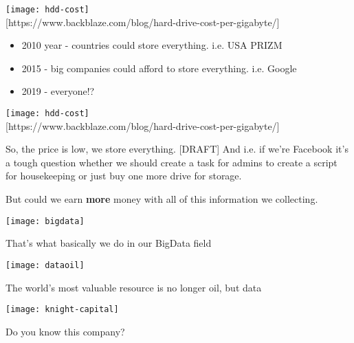\documentclass[aspectratio=169, 15pt,usenames,dvipsnames]{beamer}
\begin{document}
\begin{gdsw}
	\centering\texttt{[image: hdd-cost]}\\
	\centering\tiny [https://www.backblaze.com/blog/hard-drive-cost-per-gigabyte/]
	\par\normalsize\centering\begin{itemize}
	\item 2010 year - countries could store everything. i.e. USA PRIZM
	\item 2015 - big companies could afford to store everything. i.e. Google
	\item 2019 - everyone!?
	\end{itemize}
\end{gdsw}
\begin{gdsw}
	\centering\texttt{[image: hdd-cost]}\\
	\centering\tiny [https://www.backblaze.com/blog/hard-drive-cost-per-gigabyte/]
	\par\Large
	So, the price is low, we store everything. 
	[DRAFT]
	And i.e. if we're Facebook it's a tough question whether we should create a task for admins to create a script for housekeeping or just buy one more drive for storage.
\end{gdsw}
\begin{gdsw}
	\par\centering\Large
	But could we earn {\bf more} money with all of this information we collecting.\\        
\end{gdsw}
\begin{gdsw}
	\centering\texttt{[image: bigdata]}
	\par
	That's what basically we do in our BigData field
\end{gdsw}
\begin{gdsw}
	\centering\texttt{[image: dataoil]}
	\par
	The world’s most valuable resource is no longer oil, but data
\end{gdsw}
\begin{gdsw}
	\centering\texttt{[image: knight-capital]}
	\par\LARGE
	Do you know this company? 
\end{gdsw}
\end{document}
